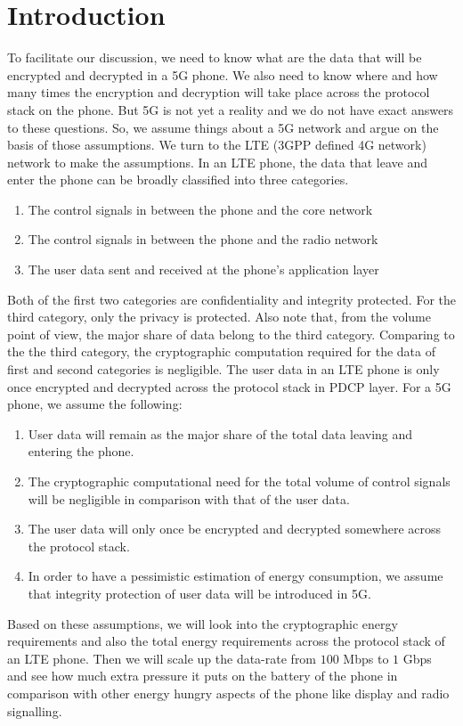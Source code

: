 \documentclass[lnicst,sechang,a4paper]{svmultln}
\begin{document}
\section{Introduction}
\label{intro} To facilitate our discussion, we need to know what are the data that will be encrypted and decrypted in a 5G phone. We also need to know where and how many times the encryption and decryption will take place across the protocol stack on the phone. But 5G is not yet a reality and we do not have exact answers to these questions. So, we assume things about a 5G network and argue on the basis of those assumptions. We turn to the LTE (3GPP defined 4G network) network to make the assumptions. In an LTE phone, the data that leave and enter the phone can be broadly classified into three categories. 
\begin{enumerate}
\item The control signals in between the phone and the core network
\item The control signals in between the phone and the radio network
\item The user data sent and received at the phone's application layer
\end{enumerate}
Both of the first two categories are confidentiality and integrity protected. For the third category, only the privacy is protected. Also note that, from the volume point of view, the major share of data belong to the third category. Comparing to the the third category, the cryptographic computation required for the data of first and second categories is negligible. The user data in an LTE phone is only once encrypted and decrypted across the protocol stack in PDCP layer. For a 5G phone, we assume the following:
\begin{enumerate}
\item User data will remain as the major share of the total data leaving and entering the phone.
\item The cryptographic computational need for the total volume of control signals will be negligible in comparison with that of the user data.
\item The user data will only once be encrypted and decrypted somewhere across the protocol stack.
\item In order to have a pessimistic estimation of energy consumption, we assume that integrity protection of user data will be introduced in 5G.
\end{enumerate}
Based on these assumptions, we will look into the cryptographic energy requirements and also the total energy requirements across the protocol stack of an LTE phone. Then we will scale up the data-rate from $100$ Mbps to $1$ Gbps and see how much extra pressure it puts on the battery of the phone in comparison with other energy hungry aspects of the phone like display and radio signalling.
\end{document}
